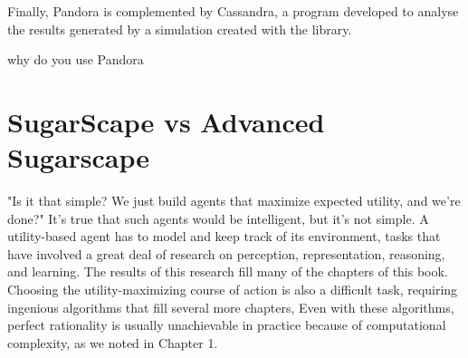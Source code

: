 \documentclass[11pt,oneside,a4paper,openright]{report}
\begin{document}
		Finally, Pandora is complemented by Cassandra, a program developed to analyse the results generated by a simulation created
		with the library. 

		why do you use Pandora

\newpage 
\chapter{SugarScape vs Advanced Sugarscape} %


"Is it that simple? We just build agents that maximize expected utility, and we're done?" 
It's true that such agents would be intelligent, but it's not simple. A utility-based agent 
has to model and keep track of its environment, tasks that have involved a great deal of research 
on perception, representation, reasoning, and learning. The results of this research fill many 
of the chapters of this book. Choosing the utility-maximizing course of action is also a difficult 
task, requiring ingenious algorithms that fill several more chapters, Even with these algorithms, 
perfect rationality is usually unachievable in practice because of computational complexity, 
as we noted in Chapter 1.\\





      
		  

		


\end{document}

